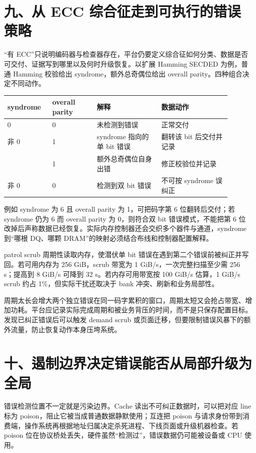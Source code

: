\section{九、从 ECC 综合征走到可执行的错误策略}

“有 ECC”只说明编码器与检查器存在，平台仍要定义综合征如何分类、数据是否可交付、证据写到哪里以及何时升级恢复。以扩展 Hamming SECDED 为例，普通 Hamming 校验给出 syndrome，额外总奇偶位给出 overall parity。四种组合决定不同动作。

\begin{longtable}{L{0.18\linewidth}L{0.18\linewidth}L{0.26\linewidth}L{0.28\linewidth}}
\toprule
syndrome & overall parity & 解释 & 数据动作 \\
 & 0 & 未检测到错误 & 正常交付 \\\tablerowrule
非 0 & 1 & syndrome 指向的单 bit 错误 & 翻转该 bit 后交付并记录 \\ & 1 & 额外总奇偶位自身出错 & 修正校验位并记录 \\\tablerowrule
非 0 & 0 & 检测到双 bit 错误 & 不可按 syndrome 误纠正 \\
\bottomrule
\end{longtable}

例如 syndrome 为 6 且 overall parity 为 1，可把码字第 6 位翻转后交付；若 syndrome 仍为 6 而 overall parity 为 0，则符合双 bit 错误模式，不能把第 6 位改掉后声称数据已经恢复。实际内存控制器还会交织多个器件与通道，syndrome 到“哪根 DQ、哪颗 DRAM”的映射必须结合布线和控制器配置解释。


patrol scrub 周期性读取内存，使潜伏单 bit 错误在遇到第二个错误前被纠正并写回。若可用内存为 256 GiB，scrub 带宽为 1 GiB/s，一次完整扫描至少需 256 s；提高到 8 GiB/s 可降到 32 s。若内存可用带宽按 100 GiB/s 估算，1 GiB/s scrub 约占 1\%，但实际干扰还取决于 bank 冲突、刷新和业务局部性。

周期太长会增大两个独立错误在同一码字累积的窗口，周期太短又会抢占带宽、增加功耗。平台应记录实际完成周期和被业务背压的时间，而不是只保存配置目标。发现已纠正错误后可以触发 demand scrub 或页面迁移，但要限制错误风暴下的额外流量，防止恢复动作本身压垮系统。

\section{十、遏制边界决定错误能否从局部升级为全局}

错误检测位置不一定就是污染边界。Cache 读出不可纠正数据时，可以把对应 line 标为 poison，阻止它被当成普通数据静默使用；互连把 poison 与请求身份带到消费端，操作系统再根据地址归属决定杀死进程、下线页面或升级机器检查。若 poison 位在协议桥处丢失，硬件虽然“检测过”，错误数据仍可能被设备或 CPU 使用。

